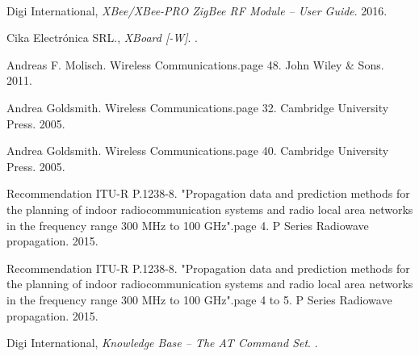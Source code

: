 \documentclass[11pt,oneside,spanish,a4paper]{article}
\begin{document}
\begin{thebibliography}{1}
  Digi International,
  \emph{XBee\textsuperscript{\textregistered{}}/XBee-PRO
    ZigBee\textsuperscript{\textregistered{}} RF Module -- User
    Guide}. 2016.
  
  Cika Electrónica SRL.,
  \emph{XBoard [-W]}.
  .

  
 Andreas F. Molisch.
Wireless Communications.page 48.
John Wiley \& Sons. 2011.

 Andrea Goldsmith.
Wireless Communications.page 32.
Cambridge University Press. 2005.

 Andrea Goldsmith.
Wireless Communications.page 40.
Cambridge University Press. 2005.

 Recommendation ITU-R P.1238-8.
"Propagation data and prediction methods
for the planning of indoor
radiocommunication systems and
radio local area networks in the
frequency range 300 MHz to 100 GHz".page 4.
P Series Radiowave propagation. 2015.

 Recommendation ITU-R P.1238-8.
"Propagation data and prediction methods
for the planning of indoor
radiocommunication systems and
radio local area networks in the
frequency range 300 MHz to 100 GHz".page 4 to 5.
P Series Radiowave propagation. 2015.

Digi International,
\emph{Knowledge Base -- The AT Command Set}.
.
\end{thebibliography}



% 

% 


% 
\end{document}
